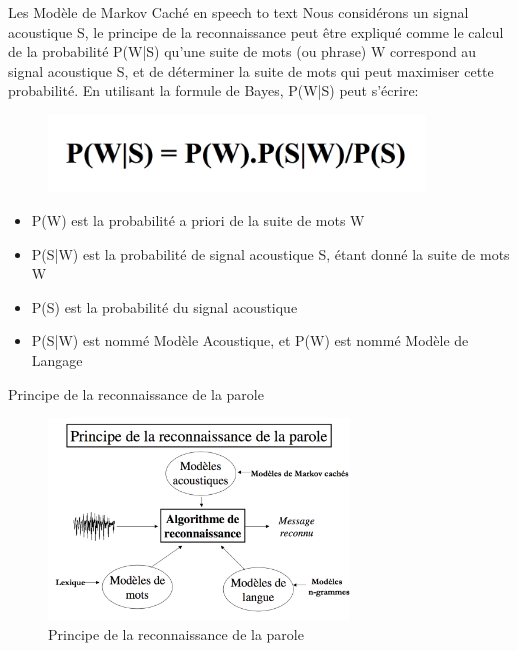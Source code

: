 \begin{frame}{Les Modèle de Markov Caché en speech to text}
Nous considérons un signal acoustique S, le principe de la reconnaissance peut être expliqué comme le calcul de la probabilité P(W|S) qu'une suite de mots (ou phrase) W correspond au signal acoustique S, et de déterminer la suite de mots qui peut maximiser cette probabilité.
En utilisant la formule de Bayes, P(W|S) peut s'écrire:
\begin{figure}
\centering
\includegraphics[width=10cm]{images/hmm_formule.png}
\end{figure}

\end{frame}

\begin{frame}{}

\begin{itemize}
\item P(W) est la probabilité a priori de la suite de mots W
\item P(S|W) est la probabilité de signal acoustique S, étant donné la suite de mots W
\item P(S) est la probabilité du signal acoustique
\item P(S|W) est nommé Modèle Acoustique, et P(W) est nommé Modèle de Langage 
\end{itemize}
\end{frame}

\begin{frame}{Principe de la reconnaissance de la parole}

\begin{figure}
\centering
\includegraphics[width=8cm]{images/principe.png}
\caption{Principe de la reconnaissance de la parole}
\end{figure}
\end{frame}
